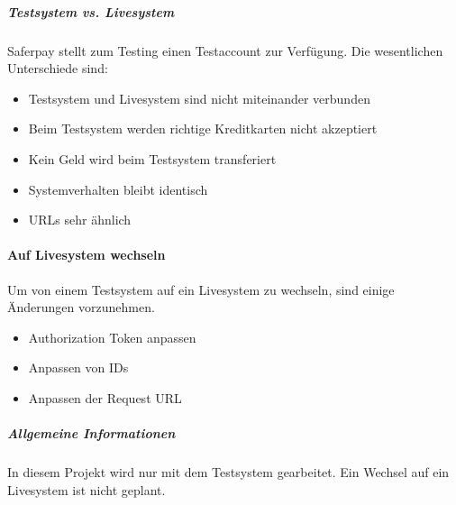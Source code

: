 \subparagraph{Testsystem vs. Livesystem}\label{testvslive}
Saferpay stellt zum Testing einen Testaccount zur Verfügung. Die wesentlichen Unterschiede sind:
\begin{itemize}
	\item Testsystem und Livesystem sind nicht miteinander verbunden
	\item Beim Testsystem werden richtige Kreditkarten nicht akzeptiert
	\item Kein Geld wird beim Testsystem transferiert
	\item Systemverhalten bleibt identisch
	\item URLs sehr ähnlich 
\end{itemize}

\paragraph{Auf Livesystem wechseln}
Um von einem Testsystem auf ein Livesystem zu wechseln, sind einige Änderungen vorzunehmen. 
\begin{itemize}
	\item Authorization Token anpassen
	\item Anpassen von IDs
	\item Anpassen der Request URL
\end{itemize} 

\subparagraph{Allgemeine Informationen}
In diesem Projekt wird nur mit dem Testsystem gearbeitet. Ein Wechsel auf ein Livesystem ist nicht geplant. 
 
